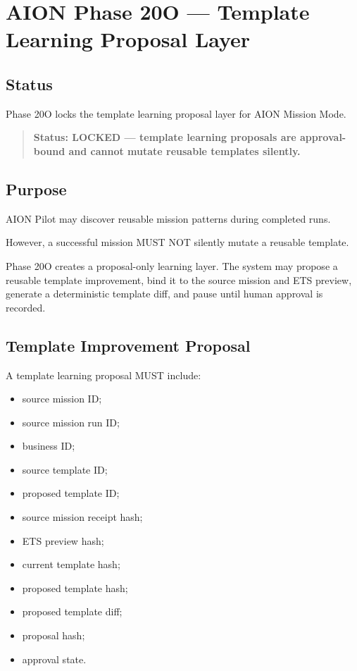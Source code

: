 \section{AION Phase 20O --- Template Learning Proposal Layer}
\label{sec:aion-phase20o-template-learning-proposal}

\subsection{Status}

Phase 20O locks the template learning proposal layer for AION Mission Mode.

\begin{quote}
\textbf{Status: LOCKED --- template learning proposals are approval-bound and cannot mutate reusable templates silently.}
\end{quote}

\subsection{Purpose}

AION Pilot may discover reusable mission patterns during completed runs.

However, a successful mission MUST NOT silently mutate a reusable template.

Phase 20O creates a proposal-only learning layer. The system may propose a reusable template improvement, bind it to the source mission and ETS preview, generate a deterministic template diff, and pause until human approval is recorded.

\subsection{Template Improvement Proposal}

A template learning proposal MUST include:

\begin{itemize}
  \item source mission ID;
  \item source mission run ID;
  \item business ID;
  \item source template ID;
  \item proposed template ID;
  \item source mission receipt hash;
  \item ETS preview hash;
  \item current template hash;
  \item proposed template hash;
  \item proposed template diff;
  \item proposal hash;
  \item approval state.
\end{itemize}

